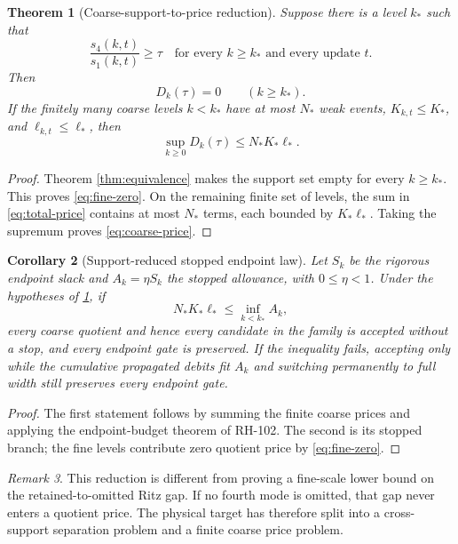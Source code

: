 \documentclass[11pt]{article}
\newtheorem{theorem}{Theorem}[section]
\newtheorem{corollary}[theorem]{Corollary}
\theoremstyle{definition}
\theoremstyle{remark}
\newtheorem{remark}[theorem]{Remark}
\begin{document}
\begin{theorem}[Coarse-support-to-price reduction]
 \label{thm:reduction}
 Suppose there is a level $k_*$ such that
 \begin{equation}
 \frac{s_4(k,t)}{s_1(k,t)}\ge\tau
 \quad\text{for every }k\ge k_*\text{ and every update }t.
 \label{eq:fine-separation}
 \end{equation}
 Then
 \begin{equation}
 D_k(\tau)=0\qquad(k\ge k_*).
 \label{eq:fine-zero}
 \end{equation}
 If the finitely many coarse levels $k<k_*$ have at most $N_*$ weak events,
 $K_{k,t}\le K_*$, and $\ell_{k,t}\le\ell_*$, then
 \begin{equation}
 \sup_{k\ge0}D_k(\tau)\le N_*K_*\ell_*.
 \label{eq:coarse-price}
 \end{equation}
\end{theorem}

\begin{proof}
 Theorem \ref{thm:equivalence} makes the support set empty for every
 $k\ge k_*$.  This proves \eqref{eq:fine-zero}.  On the remaining finite set
 of levels, the sum in \eqref{eq:total-price} contains at most $N_*$ terms,
 each bounded by $K_*\ell_*$.  Taking the supremum proves
 \eqref{eq:coarse-price}.
\end{proof}

\begin{corollary}[Support-reduced stopped endpoint law]
 \label{cor:stopped}
 Let $S_k$ be the rigorous endpoint slack and $A_k=\eta S_k$ the stopped
 allowance, with $0\le\eta<1$.  Under the hypotheses of
 \cref{thm:reduction}, if
 \[
 N_*K_*\ell_*\le\inf_{k<k_*}A_k,
 \]
 every coarse quotient and hence every candidate in the family is accepted
 without a stop, and every endpoint gate is preserved.  If the inequality
 fails, accepting only while the cumulative propagated debits fit $A_k$ and
 switching permanently to full width still preserves every endpoint gate.
\end{corollary}

\begin{proof}
 The first statement follows by summing the finite coarse prices and applying
 the endpoint-budget theorem of RH-102.  The second is its stopped branch;
 the fine levels contribute zero quotient price by \eqref{eq:fine-zero}.
\end{proof}

\begin{remark}
 This reduction is different from proving a fine-scale lower bound on the
 retained-to-omitted Ritz gap.  If no fourth mode is omitted, that gap never
 enters a quotient price.  The physical target has therefore split into a
 cross-support separation problem and a finite coarse price problem.
\end{remark}
\end{document}

